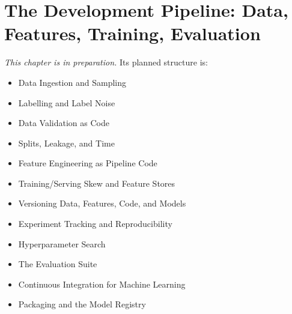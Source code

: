 
\chapter{The Development Pipeline: Data, Features, Training, Evaluation}
\label{ch:ch21}

\noindent\textit{This chapter is in preparation.} Its planned structure is:

\begin{itemize}
  \item Data Ingestion and Sampling
  \item Labelling and Label Noise
  \item Data Validation as Code
  \item Splits, Leakage, and Time
  \item Feature Engineering as Pipeline Code
  \item Training/Serving Skew and Feature Stores
  \item Versioning Data, Features, Code, and Models
  \item Experiment Tracking and Reproducibility
  \item Hyperparameter Search
  \item The Evaluation Suite
  \item Continuous Integration for Machine Learning
  \item Packaging and the Model Registry
\end{itemize}
